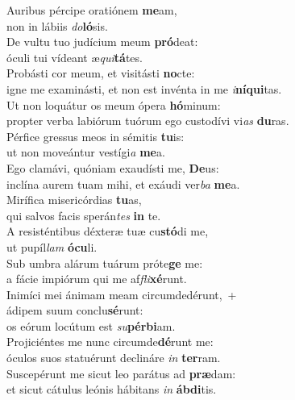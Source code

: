 \evenverse Auribus pércipe oratiónem \textbf{me}am,~\*\\
\evenverse non in lábiis \textit{do}\textbf{ló}sis.\\
\oddverse De vultu tuo judícium meum \textbf{pró}deat:~\*\\
\oddverse óculi tui vídeant æ\textit{qui}\textbf{tá}tes.\\
\evenverse Probásti cor meum, et visitásti \textbf{no}cte:~\*\\
\evenverse igne me examinásti, et non est invénta in me \textit{i}\textbf{ní}\textbf{qui}tas.\\
\oddverse Ut non loquátur os meum ópera \textbf{hó}minum:~\*\\
\oddverse propter verba labiórum tuórum ego custodívi vi\textit{as} \textbf{du}ras.\\
\evenverse Pérfice gressus meos in sémitis \textbf{tu}is:~\*\\
\evenverse ut non moveántur vestígi\textit{a} \textbf{me}a.\\
\oddverse Ego clamávi, quóniam exaudísti me, \textbf{De}us:~\*\\
\oddverse inclína aurem tuam mihi, et exáudi ver\textit{ba} \textbf{me}a.\\
\evenverse Mirífica misericórdias \textbf{tu}as,~\*\\
\evenverse qui salvos facis sperán\textit{tes} \textbf{in} te.\\
\oddverse A resisténtibus déxteræ tuæ cu\textbf{stó}di me,~\*\\
\oddverse ut pupíl\textit{lam} \textbf{ó}\textbf{cu}li.\\
\evenverse Sub umbra alárum tuárum próte\textbf{ge} me:~\*\\
\evenverse a fácie impiórum qui me af\textit{fli}\textbf{xé}runt.\\
\oddverse Inimíci mei ánimam meam circumdedérunt,~+\\
\oddverse  ádipem suum conclu\textbf{sé}runt:~\*\\
\oddverse os eórum locútum est \textit{su}\textbf{pér}\textbf{bi}am.\\
\evenverse Projiciéntes me nunc circumde\textbf{dé}runt me:~\*\\
\evenverse óculos suos statuérunt declináre \textit{in} \textbf{ter}ram.\\
\oddverse Suscepérunt me sicut leo parátus ad \textbf{præ}dam:~\*\\
\oddverse et sicut cátulus leónis hábitans \textit{in} \textbf{áb}\textbf{di}tis.\\
